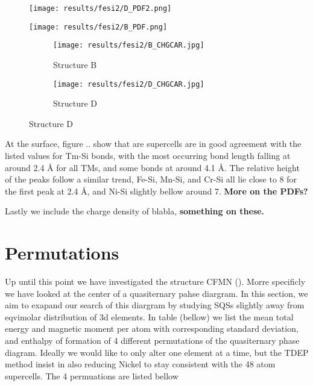 \begin{figure}[H]
	\centering
	\texttt{[image: results/fesi2/D\_PDF2.png]}
\end{figure}

\begin{figure}[H]
	\centering
	\texttt{[image: results/fesi2/B\_PDF.png]}
\end{figure}

\begin{figure}[H]
	\begin{subfigure}{.5\textwidth}
		\texttt{[image: results/fesi2/B\_CHGCAR.jpg]}
		\caption{Structure B}
	\end{subfigure}
	\hfill
	\begin{subfigure}{.5\textwidth}
		\texttt{[image: results/fesi2/D\_CHGCAR.jpg]}
		\caption{Structure D}
	\end{subfigure}
\end{figure}

At the surface, figure .. show that are supercells are in good agreement with the listed values for Tm-Si bonds, with the most occurring bond length falling at around 2.4 Å for all TMs, and some bonds at around 4.1 Å. The relative height of the peaks follow a similar trend, Fe-Si, Mn-Si, and Cr-Si all lie close to 8 for the first peak at 2.4 Å, and Ni-Si slightly bellow around 7. \textbf{More on the PDFs?}

Lastly we include the charge density of blabla, \textbf{something on these.}

\section{Permutations}

Up until this point we have investigated the structure CFMN (). Morre specificly we have looked at the center of a quasiternary pahse diargram. In this section, we aim to exapand our search of this diargram by studying SQSs slightly away from eqvimolar distribution of 3d elements. In table (bellow) we list the mean total energy and magnetic moment per atom with corresponding standard deviation, and enthalpy of formation of 4 different permutations of the quasiternary phase diagram. Ideally we would like to only alter one element at a time, but the TDEP method insist in also reducing Nickel to stay consistent with the 48 atom supercells. The 4 permuations are listed bellow

